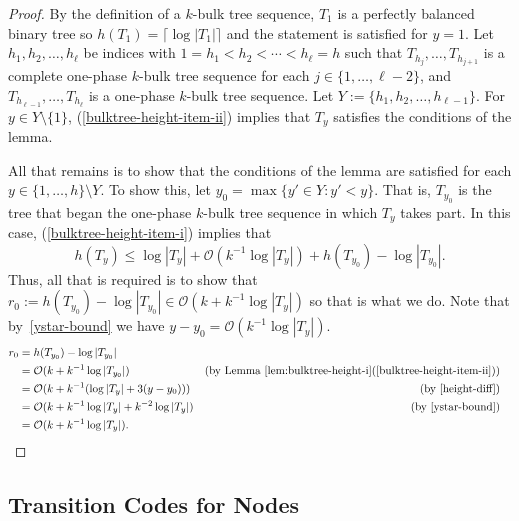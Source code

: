 \documentclass[kpfonts]{patmorin}
\newcommand{\Oh}{\mathcal{O}}
\let\le\leqslant
\begin{document}
\begin{proof}
  By the definition of a $k$-bulk tree sequence, $T_1$ is a perfectly balanced binary tree so $h(T_1)=\lceil\log|T_1|\rceil$ and the statement is satisfied for $y=1$.
  Let $h_1,h_2,\ldots,h_{\ell}$ be indices with $1=h_1 < h_2 < \cdots <h_{\ell} = h$ such that $T_{h_j},\ldots,T_{h_{j+1}}$ is a complete one-phase $k$-bulk tree sequence for each $j\in\{1,\ldots,\ell-2\}$, and $T_{h_{\ell-1}},\ldots,T_{h_{\ell}}$ is a one-phase $k$-bulk tree sequence.
  Let $Y:= \{h_1,h_2,\ldots,h_{\ell-1}\}$.
  For $y\in Y\setminus\{1\}$,
  (\ref{bulktree-height-item-ii}) implies that $T_y$ satisfies the conditions of the lemma.

  All that remains is to show that the conditions of the lemma are satisfied for each $y\in\{1,\ldots,h\}\setminus Y$. To show this, let $y_0=\max\{ y'\in Y: y'<y\}$.  That is, $T_{y_0}$ is the tree that began the one-phase $k$-bulk tree sequence in which $T_y$ takes part.
  In this case, (\ref{bulktree-height-item-i}) implies that
  \[  h(T_y) \le \log |T_y| + \Oh(k^{-1}\log |T_y|) + h(T_{y_0})-\log|T_{y_0}|.\]
  Thus, all that is required is to show that $r_0:=h(T_{y_0})-\log|T_{y_0}|\in \Oh(k+k^{-1}\log|T_y|)$ so that is what we do.
  Note that by~\eqref{ystar-bound}
  we have $y-y_0 = \Oh(k^{-1}\log|T_y|)$.
  \begin{align*}
    r_0 &= h(T_{y_0})-\log|T_{y_0}| \\
       &= \Oh(k + k^{-1}\log|T_{y_0}|)
        & \text{(by \lemref{bulktree-height-i}(\ref{bulktree-height-item-ii}))}\\
       &= \Oh(k + k^{-1}(\log|T_{y}| + 3(y-y_0)))
        & \text{(by \eqref{height-diff})} \\
       &= \Oh(k + k^{-1}\log|T_{y}| + k^{-2}\log|T_{y}|) & \text{(by \eqref{ystar-bound})} \\
       &= \Oh(k + k^{-1}\log|T_{y}|).  &  & \qedhere
  \end{align*}
\end{proof}


\subsection{Transition Codes for Nodes}
\end{document}
